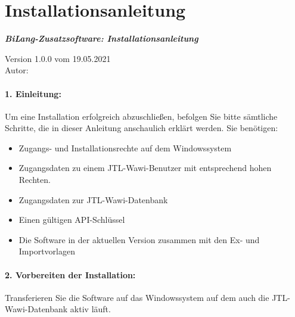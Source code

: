\section{Installationsanleitung}

\label{sec:tool_documentation}
\vspace*{36 pt}
\vspace{4cm}
\begin{center}\Huge\bfseries\itshape
BiLang-Zusatzsoftware: Installationsanleitung
\end{center}	

\vspace{11cm}
\begin{center}\large
	Version 1.0.0 vom 19.05.2021 \\
	Autor: \companyName
\end{center}

\newpage

\paragraph{1. Einleitung:}

Um eine Installation erfolgreich abzuschließen, befolgen Sie bitte sämtliche Schritte, die in dieser Anleitung anschaulich erklärt werden. Sie benötigen:

\begin{itemize}
	\item Zugangs- und Installationsrechte auf dem Windowssystem
	\item Zugangsdaten zu einem JTL-Wawi-Benutzer mit entsprechend hohen Rechten.
	\item Zugangsdaten zur JTL-Wawi-Datenbank
	\item Einen gültigen API-Schlüssel
	\item Die Software in der aktuellen Version zusammen mit den Ex- und Importvorlagen
\end{itemize}

\paragraph{2. Vorbereiten der Installation:}
Transferieren Sie die Software auf das Windowssystem auf dem auch die JTL-Wawi-Datenbank aktiv läuft.

